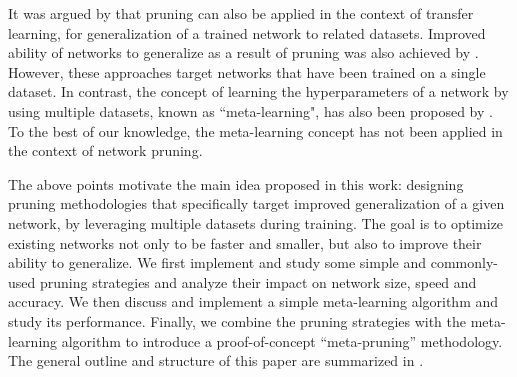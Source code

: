\documentclass{article}
\begin{document}
It was argued by \citet{prune_transfer_learning} that pruning can also be applied in the context of transfer learning, for generalization of a trained network to related datasets. Improved ability of networks to generalize as a result of pruning was also achieved by \citet{prune_for_architecture}. However, these approaches target networks that have been trained on a single dataset. In contrast, the concept of learning the hyperparameters of a network by using multiple datasets, known as ``meta-learning", has also been proposed by \citet{maml}. To the best of our knowledge, the meta-learning concept has not been applied in the context of network pruning.

The above points motivate the main idea proposed in this work: designing pruning methodologies that specifically target improved generalization of a given network, by leveraging multiple datasets during training. The goal is to optimize existing networks not only to be faster and smaller, but also to improve their ability to generalize. We first implement and study some simple and commonly-used pruning strategies and analyze their impact on network size, speed and accuracy. We then discuss and implement a simple meta-learning algorithm and study its performance. Finally, we combine the pruning strategies with the meta-learning algorithm to introduce a proof-of-concept ``meta-pruning'' methodology. The general outline and structure of this paper are summarized in .
\end{document}
